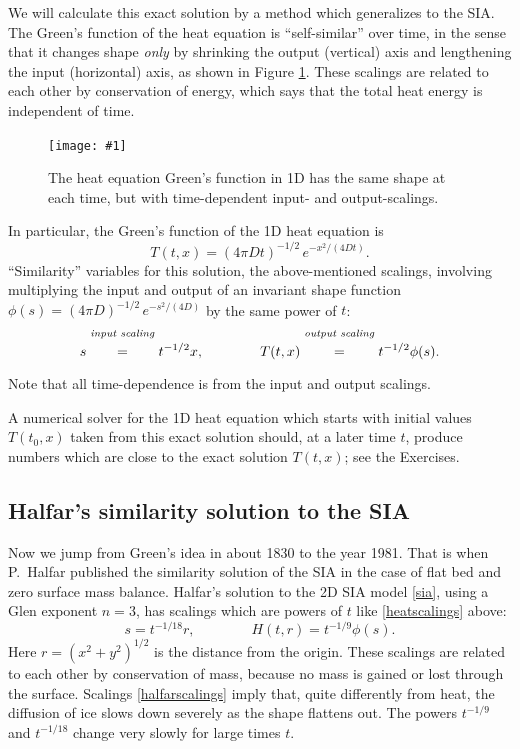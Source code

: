 \documentclass[letterpaper,final,12pt,reqno]{amsart}
\newcommand{\onefigsize}[3]{
\begin{figure}[ht]
\centering
\texttt{[image: \#1]}
\caption{#2}
\label{fig:#1}
\end{figure}}
\begin{document}
We will calculate this exact solution by a method which generalizes to the SIA.  The Green's function of the heat equation is ``self-similar'' over time, in the sense that it changes shape \emph{only} by shrinking the output (vertical) axis and lengthening the input (horizontal) axis, as shown in Figure \ref{fig:heatscaling}.  These scalings are related to each other by conservation of energy, which says that the total heat energy is independent of time.

\onefigsize{heatscaling}{The heat equation Green's function in 1D has the same shape at each time, but with time-dependent input- and output-scalings.}{2.4in}

In particular, the Green's function of the 1D heat equation is
  $$T(t,x) = (4 \pi D t)^{-1/2}\, e^{-x^2/(4Dt)}.$$
``Similarity'' variables for this solution, the above-mentioned scalings, involving multiplying the input and output of an invariant shape function $\phi(s) = (4 \pi D)^{-1/2}\, e^{-s^2/(4D)}$ by the same power of $t$:
\begin{equation}
s \stackrel{\text{\emph{input scaling}}}{\phantom{\Big|}=\phantom{\Big|}} t^{-1/2} x, \qquad\qquad T(t,x) \stackrel{\text{\emph{output scaling}}}{\phantom{\Big|}=\phantom{\Big|}} t^{-1/2} \phi(s).  \label{heatscalings}
\end{equation}
Note that all time-dependence is from the input and output scalings.

A numerical solver for the 1D heat equation which starts with initial values $T(t_0,x)$ taken from this exact solution should, at a later time $t$, produce numbers which are close to the exact solution $T(t,x)$; see the Exercises.

\subsection*{Halfar's similarity solution to the SIA}  Now we jump from Green's idea in about 1830 to the year 1981.  That is when P.~Halfar published the similarity solution of the SIA in the case of flat bed and zero surface mass balance.  Halfar's solution to the 2D SIA model \eqref{sia}, using a Glen exponent $n=3$, has scalings which are powers of $t$ like \eqref{heatscalings} above:
\begin{equation}
s = t^{-1/18} r, \qquad \qquad H(t,r)=t^{-1/9} \phi(s). \label{halfarscalings}
\end{equation}
Here $r=(x^2+y^2)^{1/2}$ is the distance from the origin.  These scalings are related to each other by conservation of mass, because no mass is gained or lost through the surface. Scalings \eqref{halfarscalings} imply that, quite differently from heat, the diffusion of ice slows down severely as the shape flattens out.  The powers $t^{-1/9}$ and $t^{-1/18}$ change very slowly for large times $t$.
\end{document}

